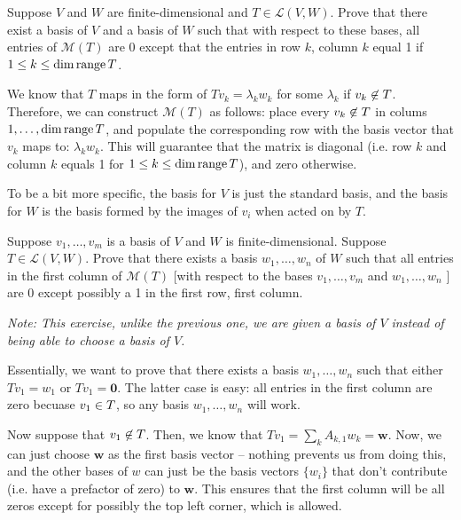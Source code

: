 \documentclass[10pt]{article}
\begin{document}
	\begin{problem}
		Suppose \( V \) and \( W \) are finite-dimensional and \( T \in \mathcal L(V, W) \). Prove that there 
		exist a basis of \( V \) and a basis of \( W \) such that with respect to these bases, all entries 
		of \( \mathcal M(T) \) are 0 except that the entries in row \( k \), column \( k \) equal 1 
		if \( 1 \le k \le \dim \operatorname*{range} T \).
	\end{problem}

	\begin{solution}
		We know that \( T \) maps in the form of \( Tv_k = \lambda_k w_k \) for some \( \lambda_k \) if 
		\( v_k \not \in \null T \). Therefore, we can construct \( \mathcal M(T) \) as follows: place every 
		\( v_k \not\in \null T \) in colums \( 1, \dots, \dim \operatorname*{range} T \), and populate the corresponding 
		row with the basis vector that \( v_k \) maps to: \( \lambda_k w_k \). This will guarantee that the 
		matrix is diagonal (i.e. row  \( k \) and column \( k \) equals 1 for \( 1 \le k\le \dim \operatorname*{range} T \)), 
		and zero otherwise. 

		To be a bit more specific, the basis for \( V \) is just the standard basis, and the basis for 
		\( W \) is the basis formed by the images of \( v_i \) when acted on by \( T \).  
	\end{solution}

	\begin{problem}
		Suppose \( v_1, \dots, v_m \) is a basis of \( V \) and \( W \) is finite-dimensional. Suppose \( T \in 
		\mathcal L(V, W)\). Prove that there exists a basis \( w_1, \dots, w_n \) of \( W \) such that 
		all entries in the first column of \( \mathcal M(T) \) [with respect to the bases 
		\( v_1, \dots, v_m \) and \( w_1, \dots ,w_n \) ] are 0 except possibly a 1 in the first row, first 
		column. 

		\textit{Note: This exercise, unlike the previous one, we are given a basis of \( V \) instead of being 
		able to choose a basis of \( V \). }
	\end{problem}

	\begin{solution}
		Essentially, we want to prove that there exists a basis \( w_1, \dots, w_n \) such that either 
		\( Tv_1 = w_1 \) or \( Tv_1 = \mathbf 0 \). The latter case is easy: all entries in the first column are zero 
		becuase \( v_1 \in \null T \), so any basis \( w_1, \dots, w_n \) will work. 

		Now suppose that \( v_1 \not \in \null T \). Then, we know that \( Tv_1 = \sum_k A_{k, 1}w_k = \mathbf w\).
		Now, we can just choose \( \mathbf w \) as the first basis vector -- nothing prevents us from doing this, and 
		the other bases of \( w \) can just be the basis vectors \( \{w_i\}  \) that don't contribute (i.e. 
		have a prefactor of zero) to \( \mathbf w \). This ensures that the first column will be all zeros 
		except for possibly the top left corner, which is allowed.  
	\end{solution}
\end{document}
